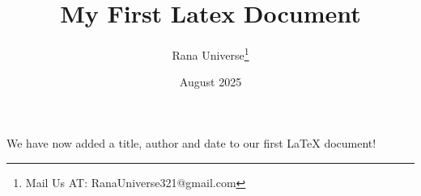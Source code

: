 \documentclass[12pt, letterpaper]{article}
\title{My First Latex Document}
\author{Rana Universe\thanks{Mail Us AT: RanaUniverse321@gmail.com}}
\date{August 2025}
\begin{document}
\maketitle

We have now added a title, author and date to our first \LaTeX{} document!
\end{document}
